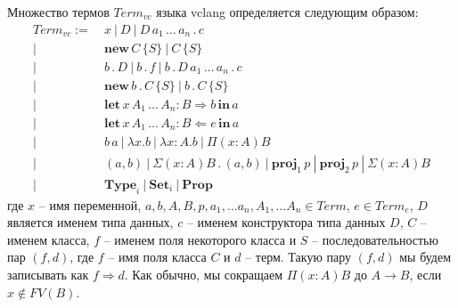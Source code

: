 \documentclass{amsart}
\theoremstyle{definition}
\theoremstyle{remark}
\newcommand{\red}{\Rightarrow}
\numberwithin{figure}{section}
\begin{document}
Множество термов $Term_{vc}$ языка vclang определяется следующим образом:
\begin{align*}
Term_{vc} :=\ & x\ |\ D\ |\ D\,a_1\,\ldots\,a_n\,.\,c \\
      |\ & \mathbf{new}\,C\,\{ S \}\ |\ C\,\{ S \} \\
      |\ & b\,.\,D\ |\ b\,.\,f\ |\ b\,.\,D\,a_1\,\ldots\,a_n\,.\,c \\
      |\ & \mathbf{new}\,b\,.\,C\,\{ S \}\ |\ b\,.\,C\,\{ S \} \\
      |\ & \mathbf{let}\,x\,A_1\,\ldots\,A_n : B \Rightarrow b\,\mathbf{in}\,a \\
      |\ & \mathbf{let}\,x\,A_1\,\ldots\,A_n : B \Leftarrow e\,\mathbf{in}\,a \\
      |\ & b\,a\ |\ \lambda x. b\ |\ \lambda x : A. b\ |\ \Pi (x : A) B \\
      |\ & (a,b)\ |\ \Sigma (x : A) B\,.\,(a,b)\ |\ \mathbf{proj}_1\,p\ |\ \mathbf{proj}_2\,p\ |\ \Sigma (x : A) B \\
      |\ & \mathbf{Type}_i\ |\ \mathbf{Set}_i\ |\ \mathbf{Prop}
\end{align*}
где $x$ -- имя переменной, $a, b, A, B, p, a_1, \ldots a_n, A_1, \ldots A_n \in Term$, $e \in Term_e$, $D$ является именем типа данных, $c$ -- именем конструктора типа данных $D$, $C$ -- именем класса, $f$ -- именем поля некоторого класса и $S$ -- последовательностью пар $(f,d)$, где $f$ -- имя поля класса $C$ и $d$ -- терм.
Такую пару $(f,d)$ мы будем записывать как $f \red d$.
Как обычно, мы сокращаем $\Pi (x : A) B$ до $A \to B$, если $x \notin FV(B)$.



\end{document}

